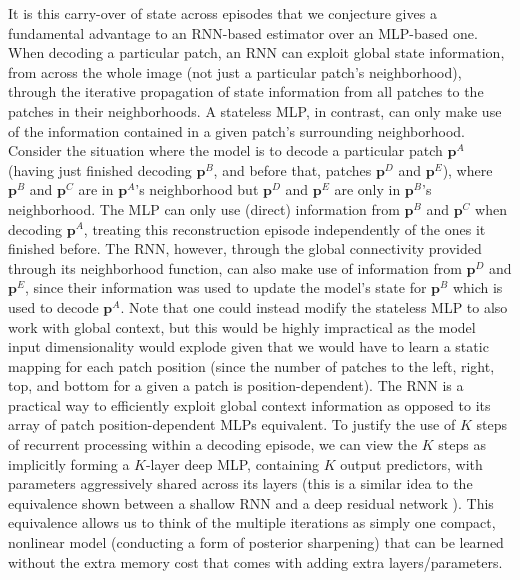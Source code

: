 \documentclass[smallabstract,smallcaptions]{dccpaper}
\begin{document}
It is this carry-over of state across episodes that we conjecture gives a fundamental advantage to an RNN-based estimator over an MLP-based one. When decoding a particular patch, an RNN can exploit global state information, from across the whole image (not just a particular patch's neighborhood), through the iterative propagation of state information from all patches to the patches in their neighborhoods. A stateless MLP, in contrast, can only make use of the information contained in a given patch's surrounding neighborhood. Consider the situation where the model is to decode a particular patch $\mathbf{p}^A$ (having just finished decoding $\mathbf{p}^B$, and before that, patches $\mathbf{p}^D$ and $\mathbf{p}^E$), where $\mathbf{p}^B$ and $\mathbf{p}^C$ are in $\mathbf{p}^A$'s neighborhood but $\mathbf{p}^D$ and $\mathbf{p}^E$ are only in $\mathbf{p}^B$'s neighborhood. The MLP can only use (direct) information from $\mathbf{p}^B$ and $\mathbf{p}^C$ when decoding $\mathbf{p}^A$, treating this reconstruction episode independently of the ones it finished before.
The RNN, however, through the global connectivity provided through its neighborhood function, can also make use of information from $\mathbf{p}^D$ and $\mathbf{p}^E$, since their information was used to update the model's state for $\mathbf{p}^B$ which is used to decode $\mathbf{p}^A$. Note that one could instead modify the stateless MLP to also work with global context, but this would be highly impractical as the model input dimensionality would explode given that we would have to learn a static mapping for each patch position (since the number of patches to the left, right, top, and bottom for a given a patch is position-dependent). The RNN is a practical way to efficiently exploit global context information as opposed to its array of patch position-dependent MLPs equivalent.
To justify the use of $K$ steps of recurrent processing within a decoding episode, we can view the $K$ steps as implicitly forming a $K$-layer deep MLP, containing $K$ output predictors, with parameters aggressively shared across its layers (this is a similar idea to the equivalence shown between a shallow RNN and a deep residual network \cite{liao2016bridging}). This equivalence allows us to think of the multiple iterations as simply one compact, nonlinear model (conducting a form of posterior sharpening) that can be learned without the extra memory cost that comes with adding extra layers/parameters. %
\end{document}

